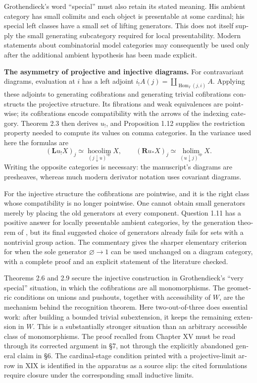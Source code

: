 \begin{otherlanguage}{english}
Grothendieck's word ``special'' must also retain its stated meaning. His
ambient category has small colimits and each object is presentable at some
cardinal; his special left classes have a small set of lifting generators.
This does not itself supply the small generating subcategory required for
local presentability. Modern statements about combinatorial model categories
may consequently be used only after the additional ambient hypothesis has
been made explicit.

\noindent\textbf{The asymmetry of projective and injective diagrams.}
For contravariant diagrams, evaluation at $i$ has a left adjoint
$i_!A(j)=\coprod_{\operatorname{Hom}_I(j,i)}A$. Applying these adjoints to
generating cofibrations and generating trivial cofibrations constructs the
projective structure. Its fibrations and weak equivalences are pointwise;
its cofibrations encode compatibility with the arrows of the indexing
category. Theorem 2.3 then derives $u_!$, and Proposition 1.12 supplies the
restriction property needed to compute its values on comma categories.
In the variance used here the formulas are
\[
 (\mathbf L u_!X)_j\simeq
   \operatorname*{hocolim}_{(j\downarrow u)^{\mathrm{op}}}X,
 \qquad
 (\mathbf R u_*X)_j\simeq
   \operatorname*{holim}_{(u\downarrow j)^{\mathrm{op}}}X.
\]
Writing the opposite categories is necessary: the manuscript's diagrams
are presheaves, whereas much modern derivator notation uses covariant
diagrams.

For the injective structure the cofibrations are pointwise, and it is the
right class whose compatibility is no longer pointwise. One cannot obtain
small generators merely by placing the old generators at every component.
Question 1.11 has a positive answer for locally presentable ambient
categories, by the generation theorem of \citet[Lemma A.2.8.3]{Lurie2009HTT},
but its final suggested choice of generators already fails for sets with a
nontrivial group action. The commentary gives the sharper elementary
criterion for when the sole generator $\varnothing\to 1$ can be used unchanged
on a diagram category, with a complete proof and an explicit statement of
the literature checked.

Theorems 2.6 and 2.9 secure the injective construction in Grothendieck's
``very special'' situation, in which the cofibrations are all monomorphisms.
The geometric conditions on unions and pushouts, together with accessibility
of $W$, are the mechanism behind the recognition theorem. Here two-out-of-three
does essential work: after building a bounded trivial subextension, it keeps
the remaining extension in $W$. This is a substantially stronger situation
than an arbitrary accessible class of monomorphisms. The proof recalled
from Chapter XV must be read through its corrected argument in \S7, not
through the explicitly abandoned general claim in \S6. The cardinal-stage
condition printed with a projective-limit arrow in XIX is identified in the
apparatus as a source slip: the cited formulations require closure under
the corresponding small inductive limits.


\end{otherlanguage}
